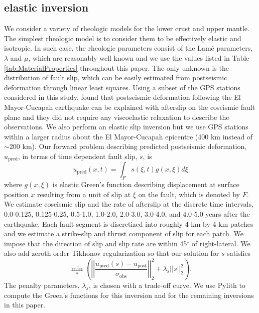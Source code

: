 \documentclass[review]{elsarticle}
\begin{document}
\subsection{elastic inversion}\label{sec:ElasticInversion}    
We consider a variety of rheologic models for the lower crust and upper mantle. The simplest rheologic model is to consider them to be effectively elastic and isotropic.  In such case, the rheologic parameters consist of the Lam\'e parameters, $\lambda$ and $\mu$, which are reasonably well known and we use the values listed in Table \ref{tab:MaterialProperties} throughout this paper.  The only unknown is the distribution of fault slip, which can be easily estimated from postseismic deformation through linear least squares.  Using a subset of the GPS stations considered in this study, \citet{Rollins2015} found that postseismic deformation following the El Mayor-Cucapah earthquake can be explained with afterslip on the coseismic fault plane and they did not require any viscoelastic relaxation to describe the observations. We also perform an elastic slip inversion but we use GPS stations within a larger radius about the El Mayor-Cucapah epicentre (400 km instead of $\sim$200 km). Our forward problem describing predicted postseismic deformation, $u_\mathrm{pred}$, in terms of time dependent fault slip, $s$, is
\begin{equation}\label{eq:ElasticForward}
  u_\mathrm{pred}(x,t) = \int_F s(\xi,t)g(x,\xi)d\xi 
\end{equation}           
where $g(x,\xi)$ is elastic Green's function describing displacement at surface position $x$ resulting from a unit of slip at $\xi$ on the fault, which is denoted by $F$.  We estimate coseismic slip and the rate of afterslip at the discrete time intervals, 0.0-0.125, 0.125-0.25, 0.5-1.0, 1.0-2.0, 2.0-3.0, 3.0-4.0, and 4.0-5.0 years after the earthquake.  Each fault segment is discretized into roughly 4 km by 4 km patches and we estimate a strike-slip and thrust component of slip for each patch. We impose that the direction of slip and slip rate are within 45$^\circ$ of right-lateral. We also add zeroth order Tikhonov regularization so that our solution for $s$ satisfies
\begin{equation}\label{eq:ElasticObjective}
  \min_s \left(\left|\left|\frac{u_\mathrm{pred}(s) - u_\mathrm{post}}                
                                {\sigma_\mathrm{obs}}\right|\right|_2^2 + 
                                \lambda_s||s||_2^2\right). 
\end{equation}
The penalty parameters, $\lambda_s$, is chosen with a trade-off curve.  We use Pylith \citep{Aagaard2009} to compute the Green's functions for this inversion and for the remaining inversions in this paper. 
\end{document}
